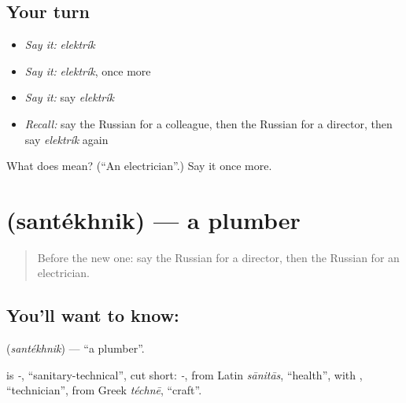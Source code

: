 \subsection*{Your turn}
\begin{itemize}
\raggedright
  \item \emph{Say it:} \emph{elektrík}
  \item \emph{Say it:} \emph{elektrík}, once more
  \item \emph{Say it:} say \emph{elektrík}
  \item \emph{Recall:} say the Russian for a colleague, then the Russian for a director, then say \emph{elektrík} again
\end{itemize}

\begin{tcolorbox}[breakable,colback=teal!4,colframe=teal!35!black,title={Before you move on}]
What does  mean? (\textquotedblleft{}An electrician\textquotedblright{}.) Say it once more.
\end{tcolorbox}
\section[\texorpdfstring{\ru{сантехник} (santékhnik)}{сантехник (santékhnik)}]{ (santékhnik) — a plumber}

\label{lesson:RU-C202-santekhnik}



\begin{quote}
Before the new one: say the Russian for a director, then the Russian for an electrician.
\end{quote}

\subsection*{You'll want to know: }
\textbf{} (\emph{santékhnik}) — \textquotedblleft{}a plumber\textquotedblright{}.

\begin{cousinweb}
\textbf{} is \emph{-}, \textquotedblleft{}sanitary-technical\textquotedblright{}, cut short: \emph{-}, from Latin \emph{sānitās}, \textquotedblleft{}health\textquotedblright{}, with \emph{}, \textquotedblleft{}technician\textquotedblright{}, from Greek \emph{téchnē}, \textquotedblleft{}craft\textquotedblright{}.
\end{cousinweb}

